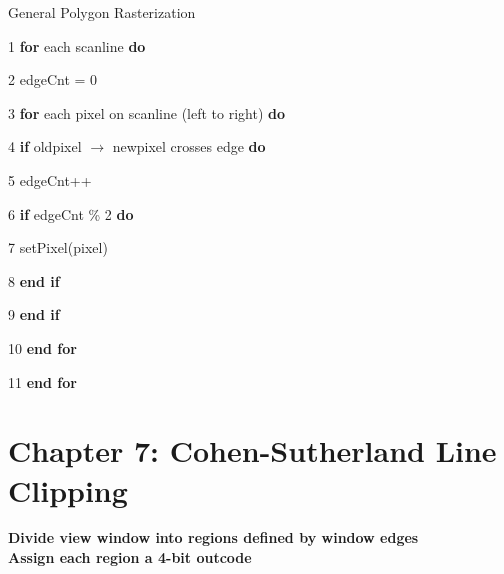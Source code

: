 \documentclass[]{report}
\begin{document}
\begin{algorithm}[h]
	\caption{General Polygon Rasterization}
	\begin{algorithmic}[1]
		\item[1] \textbf{for} each scanline \textbf{do}
		\item[2] edgeCnt = 0
		\item[3] \textbf{for} each pixel on scanline (left to right) \textbf{do}
		\item[4] \textbf{if} oldpixel $\rightarrow$ newpixel crosses edge \textbf{do}
		\item[5] edgeCnt++
		\item[6] \textbf{if} edgeCnt \% 2 \textbf{do}
		\item[7] setPixel(pixel)
		\item[8] \textbf{end if}
		\item[9] \textbf{end if}
		\item[10] \textbf{end for}
		\item[11] \textbf{end for}
	\end{algorithmic}
\end{algorithm}


\section*{Chapter 7: Cohen-Sutherland Line Clipping}
\textbf{Divide view window into regions defined by window edges}\\
\textbf{Assign each region a 4-bit outcode}\\
\end{document}
